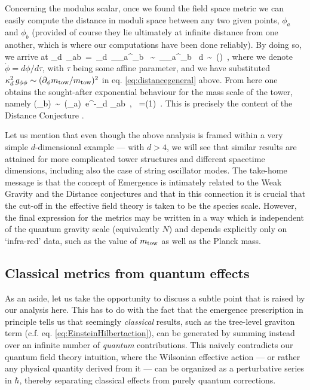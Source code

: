 Concerning the modulus scalar, once we found the field space metric we can easily compute the distance in moduli space between any two given points, $\phi_a$ and $\phi_b$ (provided of course they lie ultimately at infinite distance from one another, which is where our computations have been done reliably). By doing so, we arrive at 
%		
\beq
\label{eq:distancegeneral}
	\kappa_d\, \Delta\phi_{ab}\, =\,  \kappa_d\, \int_{\tau_a}^{\tau_b} \tau {}\, \sim \, \int_{\phi_a}^{\phi_b} \frac {\partial_\phi \Mt}{\Mt}\, d\phi\, \sim \, \log \left(\right)\, ,
\eeq
%
where we denote $\dot{\phi}=d \phi/d\tau$, with $\tau$ being some affine parameter, and we have substituted $\kappa_d^2\, g_{\phi \phi} \sim (\partial_\phi m_{\text{tow}}/m_{\text{tow}})^2$ in eq. \eqref{eq:distancegeneral} above. From here one obtains the sought-after exponential behaviour for the mass scale of the tower, namely
%
\beq
	\Mt (\phi_b)\, \sim\, \Mt(\phi_a)\, e^{-\lambda \kappa_d \Delta\phi_{ab}}\, , \qquad {}\ \lambda=(1)\, .
\eeq
%
This is precisely the content of the Distance Conjecture \cite{Ooguri:2006in}.
	
Let us mention that even though the above analysis is framed within a very simple $d$-dimensional example --- with $d>4$, we will see that similar results are attained for more complicated tower structures and different spacetime dimensions, including also the case of string oscillator modes. The take-home message is that the concept of Emergence is intimately related to the Weak Gravity and the Distance conjectures and that in this connection it is crucial that the cut-off in the effective field theory is taken to be the species scale. However, the final expression for the metrics may be written in a way which is independent of the quantum gravity scale (equivalently $N$) and depends explicitly only on `infra-red' data, such as the value of $m_{\text{tow}}$ as well as the Planck mass.
	
	
\subsection{Classical metrics from quantum effects}\label{ss:classicalfromquantum}

As an aside, let us take the opportunity to discuss a subtle point that is raised by our analysis here. This has to do with the fact that the emergence prescription in principle tells us that seemingly \emph{classical} results, such as the tree-level graviton term (c.f. eq. \eqref{eq:EinsteinHilbertaction}), can be generated by summing instead over an infinite number of \emph{quantum} contributions. This naively contradicts our quantum field theory intuition, where the Wilsonian effective action --- or rather any physical quantity derived from it --- can be organized as a perturbative series in $\hbar$, thereby separating classical effects from purely quantum corrections. 

